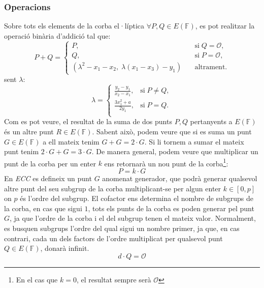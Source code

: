 \documentclass{article}
\begin{document}
\subsubsection{Operacions}
Sobre tots els elements de la corba el·líptica $\forall P, Q \in E(\mathbb{F})$, es pot realitzar la operació binària d'addició tal que:
\begin{equation*}
P + Q = \left \{ \begin{array}{ll}
	P, &\textrm{si} \; Q = \mathcal{O},\\
	Q, &\textrm{si} \; P = \mathcal{O},\\
	(\lambda^2 - x_1 - x_2, \; \lambda (x_1 - x_3) - y_1) \quad &\textrm{altrament}.
\end{array}
\right.
\end{equation*}
sent $\lambda$:
\begin{equation*}
	\lambda = \left \{ \begin{array}{ll}
		\frac{y_2 - y_1}{x_2 - x_1}, &\textrm{si} \; P \neq Q,\\
		\frac{3x_1^2 + a}{2y_1}, &\textrm{si} \; P = Q.\\
	\end{array}
	\right.
\end{equation*}
Com es pot veure, el resultat de la suma de dos punts $P, Q$ pertanyents a $E(\mathbb{F})$ és un altre punt $R \in E(\mathbb{F})$. Sabent això, podem veure que si es suma 	un punt $G \in E(\mathbb{F})$ a ell mateix tenim $G + G = 2 \cdot G$. Si li tornem a sumar el mateix punt tenim $2 \cdot G + G = 3 \cdot G$. De manera general, podem veure que multiplicar un punt de la corba per un enter $k$ ens retornarà un nou punt de la corba\footnote{En el cas que $k=0$, el resultat sempre serà $\mathcal{O}$}:
\[P = k \cdot G\]
En \textit{ECC} es defineix un punt $G$ anomenat generador, que podrà generar qualsevol altre punt del seu subgrup de la corba multiplicant-se per algun enter $k \in [0, p]$ on $p$ és l'ordre del subgrup.
El cofactor ens determina el nombre de subgrups de la corba, en cas que sigui $1$, tots els punts de la corba es poden generar pel punt $G$, ja que l'ordre de la corba i el del subgrup tenen el mateix valor. Normalment, es busquen subgrups l'ordre del qual sigui un nombre primer, ja que, en cas contrari, cada un dels factors de l'ordre multiplicat per qualsevol punt $Q \in E(\mathbb{F})$, donarà infinit.
\[d \cdot Q = \mathcal{O}\]
\end{document}
